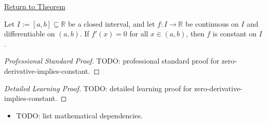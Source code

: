 \newpage
{}
\label{prf:zero-derivative-implies-constant}

\begin{remark*}[Return]
\hyperref[thm:zero-derivative-implies-constant]{Return to Theorem}
\end{remark*}

\begin{theorem*}
Let $I := [a,b] \subseteq \mathbb{R}$ be a closed interval, and let $f : I \to \mathbb{R}$ be continuous on $I$ and differentiable on $(a,b)$. If $f'(x) = 0$ for all $x \in (a,b)$, then $f$ is constant on $I$.
\end{theorem*}

\begin{proof}[Professional Standard Proof]
\LRAProofBodyStart
TODO: professional standard proof for zero-derivative-implies-constant.
\end{proof}

\begin{proof}[Detailed Learning Proof]
\LRAProofBodyStart
TODO: detailed learning proof for zero-derivative-implies-constant.
\end{proof}

\begin{remark*}
\end{remark*}

\begin{dependencies}
\begin{itemize}
  \item TODO: list mathematical dependencies.
\end{itemize}
\end{dependencies}

\clearpage
